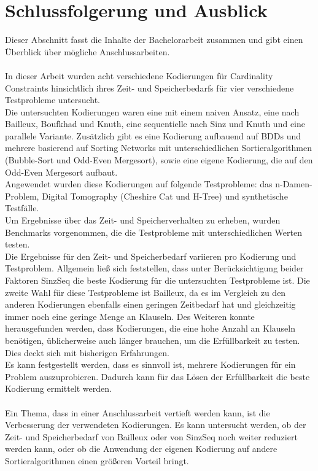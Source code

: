 \documentclass[a4,abstract=on]{scrartcl}
\newcommand*\stdsection{}
\let\stdsection\section
\renewcommand*\section{%
    \clearpage\ifodd\value{page}\else\mbox{}\clearpage\fi
    \stdsection}
\begin{document}
\section{Schlussfolgerung und Ausblick}
Dieser Abschnitt fasst die Inhalte der Bachelorarbeit zusammen und gibt einen Überblick über mögliche Anschlussarbeiten.\\
\ \\
In dieser Arbeit wurden acht verschiedene Kodierungen für Cardinality Constraints hinsichtlich ihres Zeit- und Speicherbedarfs für vier verschiedene Testprobleme untersucht.\\
Die untersuchten Kodierungen waren eine mit einem naiven Ansatz, eine nach Bailleux, Boufkhad und Knuth, eine sequentielle nach Sinz und Knuth und eine parallele Variante. Zusätzlich gibt es eine Kodierung aufbauend auf BDDs und mehrere basierend auf Sorting Networks mit unterschiedlichen Sortieralgorithmen (Bubble-Sort und Odd-Even Mergesort), sowie eine eigene Kodierung, die auf den Odd-Even Mergesort aufbaut.\\
Angewendet wurden diese Kodierungen auf folgende Testprobleme: das n-Damen-Problem, Digital Tomography (Cheshire Cat und H-Tree) und synthetische Testfälle.\\
Um Ergebnisse über das Zeit- und Speicherverhalten zu erheben, wurden Benchmarks vorgenommen, die die Testprobleme mit unterschiedlichen Werten testen. \\
Die Ergebnisse für den Zeit- und Speicherbedarf variieren pro Kodierung und Testproblem. Allgemein ließ sich feststellen, dass unter Berücksichtigung beider Faktoren SinzSeq die beste Kodierung für die untersuchten Testprobleme ist. Die zweite Wahl für diese Testprobleme ist Bailleux, da es im Vergleich zu den anderen Kodierungen ebenfalls einen geringen Zeitbedarf hat und gleichzeitig immer noch eine geringe Menge an Klauseln. Des Weiteren konnte herausgefunden werden, dass Kodierungen, die eine hohe Anzahl an Klauseln benötigen, üblicherweise auch länger brauchen, um die Erfüllbarkeit zu testen. Dies deckt sich mit bisherigen Erfahrungen.\\
Es kann festgestellt werden, dass es sinnvoll ist, mehrere Kodierungen für ein Problem auszuprobieren. Dadurch kann für das Lösen der Erfüllbarkeit die beste Kodierung ermittelt werden.\\
\ \\
Ein Thema, dass in einer Anschlussarbeit vertieft werden kann, ist die Verbesserung der verwendeten Kodierungen. Es kann untersucht werden, ob der Zeit- und Speicherbedarf von Bailleux oder von SinzSeq noch weiter reduziert werden kann, oder ob die Anwendung der eigenen Kodierung auf andere Sortieralgorithmen einen größeren Vorteil bringt.\\
\end{document}
